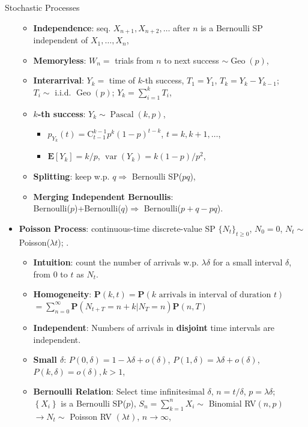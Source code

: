 \documentclass[landscape,a4paper]{article}
\newcommand{\C}[2]{\mathrm{C}_{#1}^{#2}}
\newcommand{\EE}{\mathbf{E}}
\newcommand{\var}{\operatorname{var}}
\begin{document}
\begin{multicols*}{4}
\begin{card}{Stochastic Processes}
\begin{itemize}
\begin{itemize}
					\item \textbf{Independence}: seq. $X_{n+1}, X_{n+2}, \dots$ after $n$ is a Bernoulli SP independent of $X_1,\dots,X_n$,
					\item \textbf{Memoryless}: $W_n=$ trials from $n$ to next success $\sim\operatorname{Geo}(p)$,
					\item \textbf{Interarrival}: $Y_k=$ time of $k$-th success, $T_1=Y_1$, $T_k=Y_k-Y_{k-1}$;\\ $T_i\sim$ i.i.d. $\operatorname{Geo}(p)$; $Y_k=\sum_{i=1}^kT_i$,
					\item \textbf{$k$-th success}: $Y_k\sim\operatorname{Pascal}(k,p)$,
					\begin{itemize}
						\item $p_{Y_k}(t)=\C{t-1}{k-1}p^k(1-p)^{t-k}$, $t=k,k+1,\dots$,
						\item $\EE[Y_k]=k/p$, $\var(Y_k)=k(1-p)/p^2$,
					\end{itemize}
					\item \textbf{Splitting}: keep w.p. $q\Rightarrow$ Bernoulli SP($pq$),
					\item \textbf{Merging Independent Bernoullis}:\\ Bernoulli($p$)+Bernoulli($q$)$\Rightarrow$ Bernoulli($p+q-pq$).
				\end{itemize}
				\item \textbf{Poisson Process}: continuous-time discrete-value SP $\{N_t\}_{t\ge0}$, $N_0=0$, $N_t\sim$ Poisson($\lambda t$); .
				\begin{itemize}
					\item \textbf{Intuition}: count the number of arrivals w.p. $\lambda\delta$ for a small interval $\delta$, from $0$ to $t$ as $N_t$. 
					\item \textbf{Homogeneity}: $\mathbf P(k,t)=\mathbf P(\text{$k$ arrivals in interval of duration $t$})$\\$=\sum_{n=0}^\infty \mathbf P(N_{t+T}=n+k|N_T=n)\mathbf P(n,T)$
					\item \textbf{Independent}: Numbers of arrivals in \textbf{disjoint} time intervals are independent.
					\item \textbf{Small $\delta$}: $P(0,\delta)=1-\lambda\delta+o(\delta)$, $P(1,\delta)=\lambda\delta+o(\delta)$, \\$P(k,\delta)=o(\delta),k>1$,
					\item \textbf{Bernoulli Relation}: Select time infinitesimal $\delta$, $n=t/\delta$, $p=\lambda\delta$;\\
					$\left\{X_i\right\}$ is a Bernoulli SP($p$), $S_n=\sum_{k=1}^n X_i \sim $ Binomial RV$(n,p)$ $\to N_t \sim$ Poisson RV $(\lambda t)$, $n\to\infty$,

\end{itemize}
\end{itemize}
\end{card}
\end{multicols*}
\end{document}
